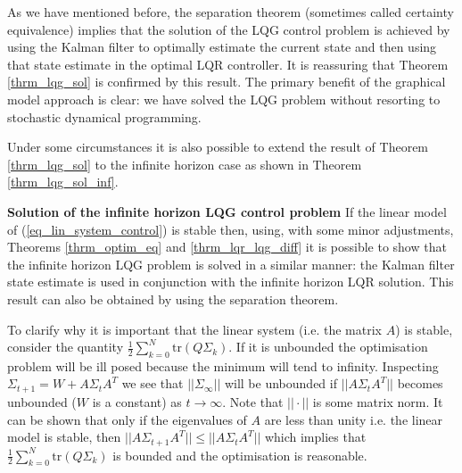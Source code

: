 As we have mentioned before, the separation theorem (sometimes called certainty equivalence) implies that the solution of the LQG control problem is achieved by using the Kalman filter to optimally estimate the current state and then using that state estimate in the optimal LQR controller. It is reassuring that Theorem \ref{thrm_lqg_sol} is confirmed by this result. The primary benefit of the graphical model approach is clear: we have solved the LQG problem without resorting to stochastic dynamical programming.

Under some circumstances it is also possible to extend the result of Theorem \ref{thrm_lqg_sol} to the infinite horizon case as shown in Theorem \ref{thrm_lqg_sol_inf}.
\begin{thrm}
\textbf{Solution of the infinite horizon LQG control problem} If the linear model of (\ref{eq_lin_system_control}) is stable then, using, with some minor adjustments, Theorems \ref{thrm_optim_eq} and \ref{thrm_lqr_lqg_diff} it is possible to show that the infinite horizon LQG problem is solved in a similar manner: the Kalman filter state estimate is used in conjunction with the infinite horizon LQR solution. This result can also be obtained by using the separation theorem. \label{thrm_lqg_sol_inf}
\end{thrm}
To clarify why it is important that the linear system (i.e. the matrix $A$) is stable, consider the quantity $\frac{1}{2}\sum_{k=0}^N \text{tr}(Q\Sigma_k)$. If it is unbounded the optimisation problem will be ill posed because the minimum will tend to infinity. Inspecting $\Sigma_{t+1} = W+A\Sigma_t A^T$ we see that $||\Sigma_{\infty}||$ will be unbounded if $||A\Sigma_t A^T||$ becomes unbounded ($W$ is a constant) as $t \rightarrow \infty$. Note that $||\cdot||$ is some matrix norm. It can be shown that only if the eigenvalues of $A$ are less than unity i.e. the linear model is stable, then $||A\Sigma_{t+1}A^T|| \leq ||A\Sigma_{t}A^T||$ which implies that $\frac{1}{2}\sum_{k=0}^N \text{tr}(Q\Sigma_k)$ is bounded and the optimisation is reasonable.


